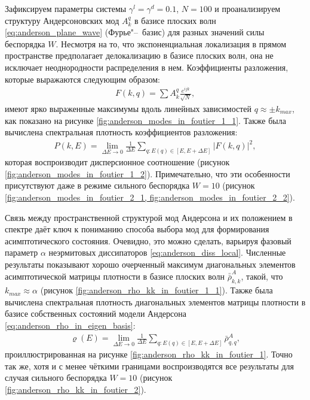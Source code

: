Зафиксируем параметры системы \(\gamma^l = \gamma^d = 0.1\), \(N=100\) и проанализируем структуру Андерсоновских мод \(A^{q}_k\) в базисе плоских волн \cref{eq:anderson_plane_wave} (Фурье"--~базис) для разных значений силы беспорядка \(W\).
Несмотря на то, что экспоненциальная локализация в прямом пространстве предполагает делокализацию в базисе плоских волн, она не исключает неоднородности распределения в нем.
Коэффициенты разложения, которые выражаются следующим образом:
\begin{equation}
\label{eq:anderson_modes_in_plane_wave}
\begin{gathered}
F(k,q) = \sum A^q_k \frac{e^{i j k}}{\sqrt{N}},
\end{gathered}
\end{equation}
имеют ярко выраженные максимумы вдоль линейных зависимостей \(q \approx \pm k_{max}\), как показано на рисунке \cref{fig:anderson_modes_in_foutier_1_1}.
Также была вычислена спектральная плотность коэффициентов разложения:
\begin{equation}
\label{eq:anderson_modes_in_plane_wave_density}
\begin{gathered}
P(k,E) = \lim_{\Delta E \to 0} \frac{1}{\Delta E} \sum_{q:E(q) \in [E, E + \Delta E]} \left| F(k,q) \right|^2 ,
\end{gathered}
\end{equation}
которая воспроизводит дисперсионное соотношение (рисунок \cref{fig:anderson_modes_in_foutier_1_2}).
Примечательно, что эти особенности присутствуют даже в режиме сильного беспорядка \(W=10\) (рисунок \cref{fig:anderson_modes_in_foutier_2_1, fig:anderson_modes_in_foutier_2_2}).

Связь между пространственной структурой мод Андерсона и их положением в спектре даёт ключ к пониманию способа выбора мод для формирования асимптотического состояния. Очевидно, это можно сделать, варьируя фазовый параметр \(\alpha\) неэрмитовых диссипаторов \cref{eq:anderson_diss_local}.
Численные результаты показывают хорошо очерченный максимум диагональных элементов асимптотической матрицы плотности в базисе плоских волн \(\bar{\bar{\rho}}^A_{k,k}\), такой, что \(k_{max} \approx \alpha\) (рисунок \cref{fig:anderson_rho_kk_in_foutier_1_1}). Также была вычислена спектральная плотность диагональных элементов матрицы плотности в базисе собственных состояний модели Андерсона \cref{eq:anderson_rho_in_eigen_basis}:
\begin{equation}
\label{eq:anderson_rho_kk_density}
\begin{gathered}
\varrho(E) = \lim_{\Delta E \to 0} \frac{1}{\Delta E} \sum_{q:E(q) \in [E, E + \Delta E]} \bar{\rho}^A_{q,q},
\end{gathered}
\end{equation}
проиллюстрированная на рисунке \cref{fig:anderson_rho_kk_in_foutier_1}. Точно так же, хотя и с менее чёткими границами воспроизводятся все результаты для случая сильного беспорядка \(W=10\) (рисунок \cref{fig:anderson_rho_kk_in_foutier_2}).

